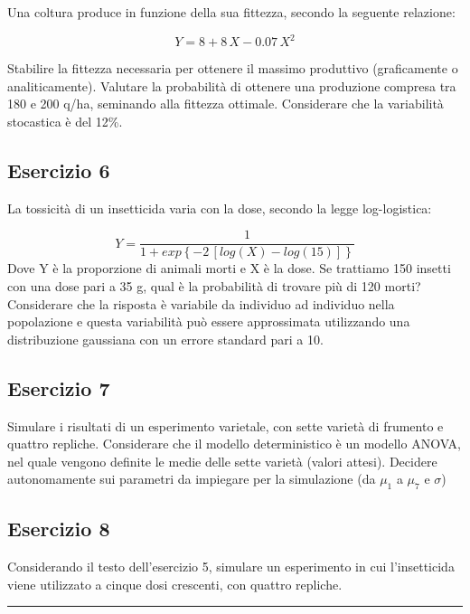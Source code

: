 \documentclass[a4paper,12pt,oneside]{book}
\begin{document}
Una coltura produce in funzione della sua fittezza, secondo la seguente relazione:

\[ Y = 8 + 8 \, X - 0.07 \, X^2\]

Stabilire la fittezza necessaria per ottenere il massimo produttivo (graficamente o analiticamente). Valutare la probabilità di ottenere una produzione compresa tra 180 e 200 q/ha, seminando alla fittezza ottimale. Considerare che la variabilità stocastica è del 12\%.

\hypertarget{esercizio-6}{%
\subsection{Esercizio 6}\label{esercizio-6}}

La tossicità di un insetticida varia con la dose, secondo la legge log-logistica:

\[ Y = \frac{1}{1 + exp\left\{ -2 \, \left[log(X) - log(15)\right] \right\}}\] Dove Y è la proporzione di animali morti e X è la dose. Se trattiamo 150 insetti con una dose pari a 35 g, qual è la probabilità di trovare più di 120 morti? Considerare che la risposta è variabile da individuo ad individuo nella popolazione e questa variabilità può essere approssimata utilizzando una distribuzione gaussiana con un errore standard pari a 10.

\hypertarget{esercizio-7}{%
\subsection{Esercizio 7}\label{esercizio-7}}

Simulare i risultati di un esperimento varietale, con sette varietà di frumento e quattro repliche. Considerare che il modello deterministico è un modello ANOVA, nel quale vengono definite le medie delle sette varietà (valori attesi). Decidere autonomamente sui parametri da impiegare per la simulazione (da \(\mu_1\) a \(\mu_7\) e \(\sigma\))

\hypertarget{esercizio-8}{%
\subsection{Esercizio 8}\label{esercizio-8}}

Considerando il testo dell'esercizio 5, simulare un esperimento in cui l'insetticida viene utilizzato a cinque dosi crescenti, con quattro repliche.

\begin{center}\rule{0.5\linewidth}{0.5pt}\end{center}
\end{document}

